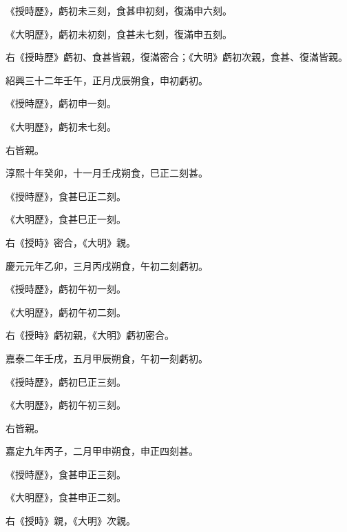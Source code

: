 \begin{pinyinscope}
 《授時歷》，虧初未三刻，食甚申初刻，復滿申六刻。



 《大明歷》，虧初未初刻，食甚未七刻，復滿申五刻。



 右《授時歷》虧初、食甚皆親，復滿密合；《大明》虧初次親，食甚、復滿皆親。



 紹興三十二年壬午，正月戊辰朔食，申初虧初。



 《授時歷》，虧初申一刻。



 《大明歷》，虧初未七刻。



 右皆親。



 淳熙十年癸卯，十一月壬戌朔食，巳正二刻甚。



 《授時歷》，食甚巳正二刻。



 《大明歷》，食甚巳正一刻。



 右《授時》密合，《大明》親。



 慶元元年乙卯，三月丙戌朔食，午初二刻虧初。



 《授時歷》，虧初午初一刻。



 《大明歷》，虧初午初二刻。



 右《授時》虧初親，《大明》虧初密合。



 嘉泰二年壬戌，五月甲辰朔食，午初一刻虧初。



 《授時歷》，虧初巳正三刻。



 《大明歷》，虧初午初三刻。



 右皆親。



 嘉定九年丙子，二月甲申朔食，申正四刻甚。



 《授時歷》，食甚申正三刻。



 《大明歷》，食甚申正二刻。



 右《授時》親，《大明》次親。




\end{pinyinscope}
